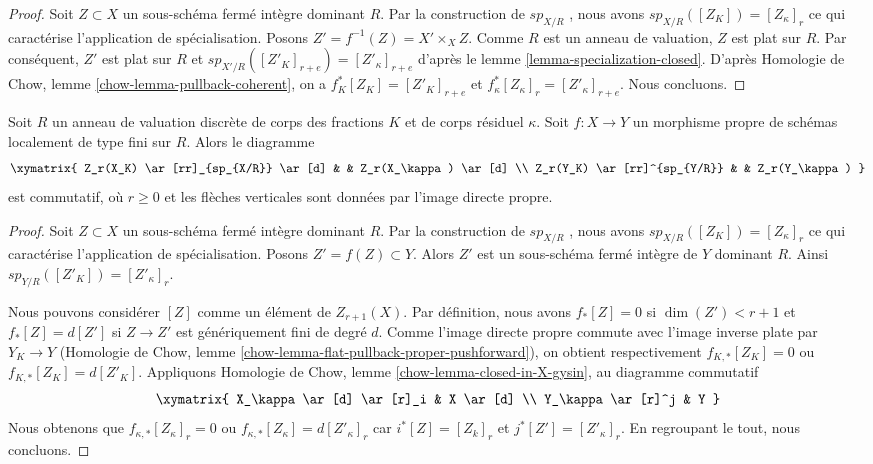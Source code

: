 \begin{proof} 
Soit  $Z \subset X$  un sous-schéma fermé intègre dominant  $R$.
 Par la construction de  $sp_{X/R}$ , nous avons  $sp_{X/R}([Z_K]) = [Z_\kappa]_r$
  ce qui caractérise l'application de spécialisation. 
Posons  $Z' = f^{-1}(Z) = X' \times_X Z$.
 Comme  $R$  est un anneau de valuation,  $Z$  est plat sur  $R$. 
Par conséquent, $Z'$  est plat sur  $R$  et  
$sp_{X'/R}([Z'_K]_{r + e}) = [Z'_\kappa]_{r + e}$
  d'après le lemme \ref{lemma-specialization-closed}. 
D'après Homologie de Chow, lemme \ref{chow-lemma-pullback-coherent},
 on a $f_K^*[Z_K] = [Z'_K]_{r + e}$  et  
$f_\kappa^*[Z_\kappa]_r = [Z'_\kappa]_{r + e}$. Nous concluons. 
\end{proof} 

\begin{lemma} 
\label{lemma-specialization-proper-pushforward} 
Soit  $R$  un anneau de valuation discrète de corps des fractions $K$ et de corps résiduel  
$\kappa$. Soit  $f : X \to Y$  un morphisme propre de schémas localement 
de type fini sur  $R$. Alors le diagramme 
$$
\xymatrix{
Z_r(X_K) \ar[rr]_{sp_{X/R}} \ar[d] & & Z_r(X_\kappa) \ar[d] \\
Z_r(Y_K) \ar[rr]^{sp_{Y/R}} & & Z_r(Y_\kappa)
}
$$
 est commutatif, où  $r \geq 0$  et les flèches verticales sont données 
par l'image directe propre. 
\end{lemma} 

\begin{proof} 
Soit  $Z \subset X$  un sous-schéma fermé intègre dominant  $R$.
 Par la construction de  $sp_{X/R}$ , nous avons  $sp_{X/R}([Z_K]) = [Z_\kappa]_r$
  ce qui caractérise l'application de spécialisation. 
Posons  $Z' = f(Z) \subset Y$. Alors  $Z'$  est un sous-schéma fermé intègre 
de  $Y$  dominant  $R$. Ainsi $sp_{Y/R}([Z'_K]) = [Z'_\kappa]_r$. 

\medskip\noindent
 Nous pouvons considérer  $[Z]$  comme un élément de  $Z_{r + 1}(X)$. Par définition, 
nous avons  $f_*[Z] = 0$  si  $\dim(Z') < r + 1$  et  $f_*[Z] = d[Z']$
  si $Z \to Z'$  est génériquement fini de degré  $d$.
 Comme l'image directe propre commute avec l'image inverse plate par  $Y_K \to Y$
  (Homologie de Chow, lemme \ref{chow-lemma-flat-pullback-proper-pushforward}),
 on obtient respectivement  $f_{K, *}[Z_K] = 0$  ou  $f_{K, *}[Z_K] = d[Z'_K]$.
 Appliquons Homologie de Chow, lemme \ref{chow-lemma-closed-in-X-gysin}, 
au diagramme commutatif 
$$
\xymatrix{
X_\kappa \ar[d] \ar[r]_i & X \ar[d] \\
Y_\kappa \ar[r]^j & Y
}
$$
 Nous obtenons que  $f_{\kappa, *}[Z_\kappa]_r = 0$  ou  
$f_{\kappa, *}[Z_\kappa] = d[Z'_\kappa]_r$  car
  $i^*[Z] = [Z_k]_r$ et  $j^*[Z'] = [Z'_\kappa]_r$.
 En regroupant le tout, nous concluons. 
\end{proof} 










